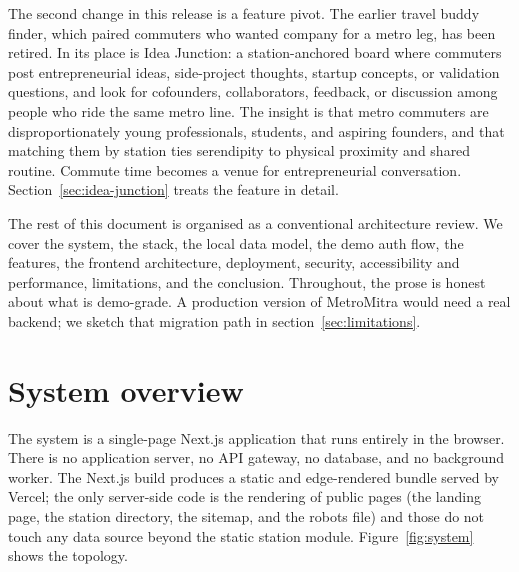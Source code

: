 \documentclass[a4paper,11pt]{article}
\begin{document}
The second change in this release is a feature pivot. The earlier travel buddy
finder, which paired commuters who wanted company for a metro leg, has been
retired. In its place is Idea Junction: a station-anchored board where
commuters post entrepreneurial ideas, side-project thoughts, startup concepts,
or validation questions, and look for cofounders, collaborators, feedback, or
discussion among people who ride the same metro line. The insight is that metro
commuters are disproportionately young professionals, students, and aspiring
founders, and that matching them by station ties serendipity to physical
proximity and shared routine. Commute time becomes a venue for entrepreneurial
conversation. Section~\ref{sec:idea-junction} treats the feature in detail.

The rest of this document is organised as a conventional architecture review.
We cover the system, the stack, the local data model, the demo auth flow, the
features, the frontend architecture, deployment, security, accessibility and
performance, limitations, and the conclusion. Throughout, the prose is honest
about what is demo-grade. A production version of MetroMitra would need a real
backend; we sketch that migration path in section~\ref{sec:limitations}.


\section{System overview}

The system is a single-page Next.js application that runs entirely in the
browser. There is no application server, no API gateway, no database, and no
background worker. The Next.js build produces a static and edge-rendered
bundle served by Vercel; the only server-side code is the rendering of public
pages (the landing page, the station directory, the sitemap, and the robots
file) and those do not touch any data source beyond the static station module.
Figure~\ref{fig:system} shows the topology.
\end{document}
